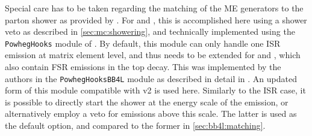 Special care has to be taken regarding the matching of the \powheg ME generators to the parton shower as provided by \pythia.  %
For \hvq and \ST, this is accomplished here using a shower veto as described in \cref{sec:mc:showering}, and technically implemented using the \texttt{PowhegHooks} module of \pythia. By default, this module can only handle one ISR emission at matrix element level, and thus needs to be extended for \bbfourl and \ttb, which also contain FSR emissions in the top decay. This was implemented by the \bbfourl authors in the \texttt{PowhegHooksBB4L} module as described in detail in . An updated form of this module compatible with \bbfourl v2 is used here. Similarly to the ISR case, it is possible to directly start the shower at the energy scale of the \powheg emission, or alternatively employ a veto for emissions above this scale. The latter is used as the default option, and compared to the former in \cref{sec:bb4l:matching}.




